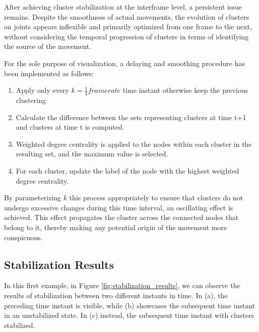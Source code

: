 After achieving cluster stabilization at the interframe level, a persistent issue remains. 
Despite the smoothness of actual movements, the evolution of clusters on joints appears inflexible 
and primarily optimized from one frame to the next, 
without considering the temporal progression of clusters in terms of identifying the source of the movement.

For the sole purpose of visualization, a delaying and smoothing procedure has been implemented as follows:
\begin{enumerate}
  \item Apply only every $k = \frac{1}{4}framerate$ time instant otherwise keep the previous clustering
  \item Calculate the difference between the sets representing clusters at time t+1 and clusters at time t is computed.
  \item Weighted degree centrality is applied to the nodes within each cluster in the resulting set, and the maximum value is selected.
  \item For each cluster, update the label of the node with the highest weighted degree centrality.
\end{enumerate}

By parameterizing $k$ this process appropriately to ensure that clusters do not undergo excessive changes during this time interval, an oscillating effect is achieved. 
This effect propagates the cluster across the connected nodes that belong to it, thereby making any potential origin of the movement more conspicuous.

\subsection{Stabilization Results}
In this first example, in Figure \ref{fig:stabilization_results}, we can observe the results of stabilization between two different instants in time. 
In (a), the preceding time instant is visible, while (b) showcases the subsequent time instant in an unstabilized state. 
In (c) instead, the subsequent time instant with clusters stabilized.

